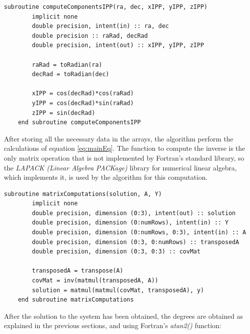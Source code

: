 \begin{minipage}{\linewidth}
	\label{lst:computeComponents}
	\begin{lstlisting}[style=myFortranStyle, caption=Compute the components of the IPP's unit vector]
	subroutine computeComponentsIPP(ra, dec, xIPP, yIPP, zIPP)
		implicit none
		double precision, intent(in) :: ra, dec
		double precision :: raRad, decRad
		double precision, intent(out) :: xIPP, yIPP, zIPP
		
		raRad = toRadian(ra)
		decRad = toRadian(dec)
		
		xIPP = cos(decRad)*cos(raRad)
		yIPP = cos(decRad)*sin(raRad)
		zIPP = sin(decRad)
	end subroutine computeComponentsIPP\end{lstlisting}
\end{minipage}

After storing all the necessary data in the arrays, the algorithm perform the calculations of equation \ref{eq:mainEq}. The function to compute the inverse is the only matrix operation that is not implemented by Fortran's standard library, so the \textit{LAPACK (Linear Algebra PACKage)} library for numerical linear algebra\cite{lapack}, which implements it, is used by the algorithm for this computation. 

\begin{minipage}{\linewidth}
	\label{lst:solveSystem}
	\begin{lstlisting}[style=myFortranStyle, caption=Function matrixComputations to solve the system]
	subroutine matrixComputations(solution, A, Y)
		implicit none
		double precision, dimension (0:3), intent(out) :: solution
		double precision, dimension (0:numRows), intent(in) :: Y
		double precision, dimension (0:numRows, 0:3), intent(in) :: A
		double precision, dimension (0:3, 0:numRows) :: transposedA
		double precision, dimension (0:3, 0:3) :: covMat
		
		transposedA = transpose(A)
		covMat = inv(matmul(transposedA, A))
		solution = matmul(matmul(covMat, transposedA), y)
	end subroutine matrixComputations\end{lstlisting}
\end{minipage}

After the solution to the system has been obtained, the degrees are obtained as explained in the previous sections, and using Fortran's \textit{atan2()} function:

